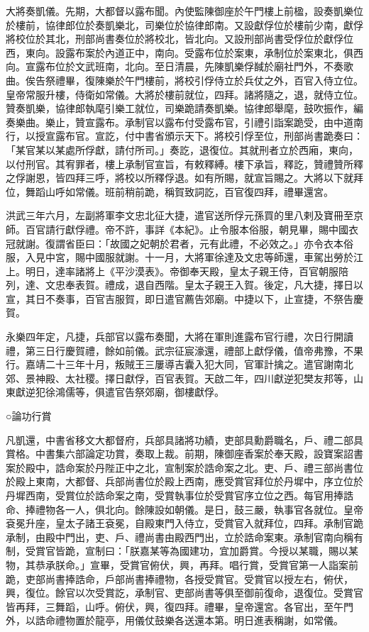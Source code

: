 大將奏凱儀。先期，大都督以露布聞。內使監陳御座於午門樓上前楹，設奏凱樂位於樓前，協律郎位於奏凱樂北，司樂位於協律郎南。又設獻俘位於樓前少南，獻俘將校位於其北，刑部尚書奏位於將校北，皆北向。又設刑部尚書受俘位於獻俘位西，東向。設露布案於內道正中，南向。受露布位於案東，承制位於案東北，俱西向。宣露布位於文武班南，北向。至日清晨，先陳凱樂俘馘於廟社門外，不奏歌曲。俟告祭禮畢，復陳樂於午門樓前，將校引俘侍立於兵仗之外，百官入侍立位。皇帝常服升樓，侍衛如常儀。大將於樓前就位，四拜。諸將隨之，退，就侍立位。贊奏凱樂，協律郎執麾引樂工就位，司樂跪請奏凱樂。協律郎舉麾，鼓吹振作，編奏樂曲。樂止，贊宣露布。承制官以露布付受露布官，引禮引詣案跪受，由中道南行，以授宣露布官。宣訖，付中書省頒示天下。將校引俘至位，刑部尚書跪奏曰：「某官某以某處所俘獻，請付所司。」奏訖，退復位。其就刑者立於西廂，東向，以付刑官。其宥罪者，樓上承制官宣旨，有敕釋縛。樓下承旨，釋訖，贊禮贊所釋之俘謝恩，皆四拜三呼，將校以所釋俘退。如有所賜，就宣旨賜之。大將以下就拜位，舞蹈山呼如常儀。班前稍前跪，稱賀致詞訖，百官復四拜，禮畢還宮。

洪武三年六月，左副將軍李文忠北征大捷，遣官送所俘元孫買的里八剌及寶冊至京師。百官請行獻俘禮。帝不許，事詳《本紀》。止令服本俗服，朝見畢，賜中國衣冠就謝。復謂省臣曰：「故國之妃朝於君者，元有此禮，不必效之。」亦令衣本俗服，入見中宮，賜中國服就謝。十一月，大將軍徐達及文忠等師還，車駕出勞於江上。明日，達率諸將上《平沙漠表》。帝御奉天殿，皇太子親王侍，百官朝服陪列，達、文忠奉表賀。禮成，退自西階。皇太子親王入賀。後定，凡大捷，擇日以宣，其日不奏事，百官吉服賀，即日遣官薦告郊廟。中捷以下，止宣捷，不祭告慶賀。

永樂四年定，凡捷，兵部官以露布奏聞，大將在軍則進露布官行禮，次日行開讀禮，第三日行慶賀禮，餘如前儀。武宗征宸濠還，禮部上獻俘儀，值帝弗豫，不果行。嘉靖二十三年十月，叛賊王三屢導吉囊入犯大同，官軍計擒之。遣官謝南北郊、景神殿、太社稷。擇日獻俘，百官表賀。天啟二年，四川獻逆犯樊友邦等，山東獻逆犯徐鴻儒等，俱遣官告祭郊廟，御樓獻俘。

○論功行賞

凡凱還，中書省移文大都督府，兵部具諸將功績，吏部具勳爵職名，戶、禮二部具賞格。中書集六部論定功賞，奏取上裁。前期，陳御座香案於奉天殿，設寶案詔書案於殿中，誥命案於丹陛正中之北，宣制案於誥命案之北。吏、戶、禮三部尚書位於殿上東南，大都督、兵部尚書位於殿上西南，應受賞官拜位於丹墀中，序立位於丹墀西南，受賞位於誥命案之南，受賞執事位於受賞官序立位之西。每官用捧誥命、捧禮物各一人，俱北向。餘陳設如朝儀。是日，鼓三嚴，執事官各就位。皇帝袞冕升座，皇太子諸王袞冕，自殿東門入侍立，受賞官入就拜位，四拜。承制官跪承制，由殿中門出，吏、戶、禮尚書由殿西門出，立於誥命案東。承制官南向稱有制，受賞官皆跪，宣制曰：「朕嘉某等為國建功，宜加爵賞。今授以某職，賜以某物，其恭承朕命。」宣畢，受賞官俯伏，興，再拜。唱行賞，受賞官第一人詣案前跪，吏部尚書捧誥命，戶部尚書捧禮物，各授受賞官。受賞官以授左右，俯伏，興，復位。餘官以次受賞訖，承制官、吏部尚書等俱至御前復命，退復位。受賞官皆再拜，三舞蹈，山呼。俯伏，興，復四拜。禮畢，皇帝還宮。各官出，至午門外，以誥命禮物置於龍亭，用儀仗鼓樂各送還本第。明日進表稱謝，如常儀。

